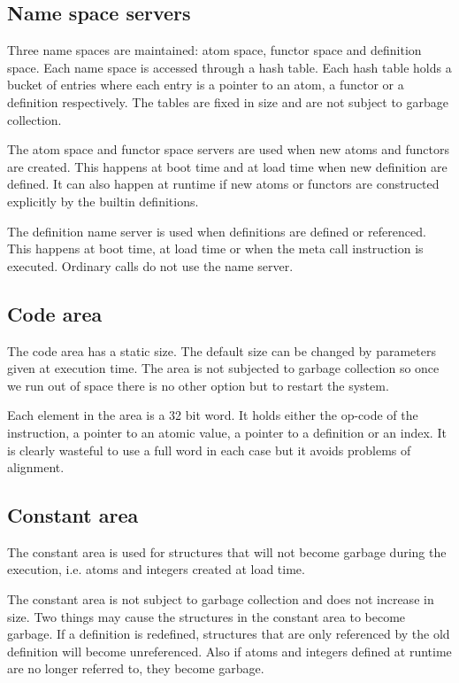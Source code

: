 \subsection*{Name space servers}

Three name spaces are maintained: atom space, functor space and
definition space. Each name space is accessed through a hash table.
Each hash table holds a bucket of entries where each entry is a
pointer to an atom, a functor or a definition respectively.
The tables are fixed in size and are not subject to garbage
collection.

The atom space and functor space servers are used when new atoms and
functors are created. This happens at boot time and at load time when new
definition are defined. It can also happen at runtime if new atoms or
functors are constructed explicitly by the builtin definitions.


The definition name server is used when definitions are 
defined or referenced. This happens at boot time, at load 
time or when the meta call instruction is executed.  Ordinary 
calls do not use the name server.

\subsection*{Code area}

The code area has a static size. The default size can be 
changed by parameters given at execution time.  The area is 
not subjected to garbage collection so once we run out of 
space there is no other option but to restart the system.

Each element in the area is a 32 bit word. It holds either the op-code
of the instruction, a pointer to an atomic value, a pointer to a
definition or an index. It is clearly wasteful to use a full word in
each case but it avoids problems of alignment.


\subsection*{Constant area}

The constant area is used for structures that will not become garbage
during the execution, i.e. atoms and integers created at load time.

The constant area is not subject to garbage collection and does not
increase in size. Two things may cause the structures in the constant
area to become garbage. If a definition is redefined, structures that
are only referenced by the old definition will become unreferenced.
Also if atoms and integers defined at runtime are no longer referred to, they
become garbage.

